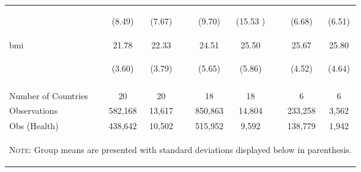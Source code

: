 \documentclass{article}[11pt,subeqn]
\begin{document}
\begin{spacing}{1.5}
\begin{table}[ht]
\begin{center}
\begin{tabular}{lccp{5mm}ccp{5mm}cc}
\begin{footnotesize}\end{footnotesize}	& \begin{footnotesize} (8.49)\end{footnotesize} & \begin{footnotesize} (7.67)\end{footnotesize} & \begin{footnotesize} 	\end{footnotesize} & \begin{footnotesize} (9.70)\end{footnotesize} & \begin{footnotesize} (15.53	)\end{footnotesize} & \begin{footnotesize} 	\end{footnotesize} & \begin{footnotesize} (6.68)\end{footnotesize} & \begin{footnotesize} (6.51)\end{footnotesize}	\\
bmi	&	21.78	&	22.33	&	&	24.51	&	25.50	&	&	25.67	&	25.80		\\
\begin{footnotesize}\end{footnotesize}	& \begin{footnotesize} (3.60)\end{footnotesize} & \begin{footnotesize} (3.79)\end{footnotesize} & \begin{footnotesize} 	\end{footnotesize} & \begin{footnotesize} (5.65)\end{footnotesize} & \begin{footnotesize} (5.86)\end{footnotesize} & \begin{footnotesize} 	\end{footnotesize} & \begin{footnotesize} (4.52)\end{footnotesize} & \begin{footnotesize} (4.64)\end{footnotesize}	\\
\\ \midrule																
Number of Countries & 20 & 20 & & 18 & 18 & & 6 & 6 \\
Observations & 582,168 & 13,617 & & 850,863 & 14,804 & & 233,258 & 3,562 \\ 
Obs (Health) & 438,642 & 10,502 & & 515,952 & 9,592 & & 138,779 & 1,942 \\ 
\bottomrule																
\multicolumn{9}{p{12cm}}{\setstretch{0.9}\begin{footnotesize}\textsc{Note:} Group means are presented with standard deviations displayed below in parenthesis.\end{footnotesize}}\\


\end{tabular}
\end{center}
\end{table}
\end{spacing}
\end{document}
